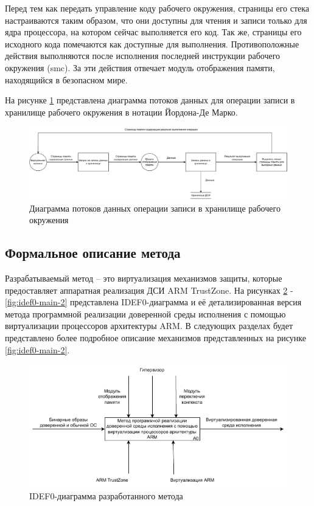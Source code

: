 Перед тем как передать управление коду рабочего окружения, страницы его стека настраиваются таким образом, что они доступны для чтения и записи только для ядра процессора, на котором сейчас выполняется его код. Так же, страницы его исходного кода помечаются как доступные для выполнения. Противоположные действия выполняются после исполнения последней инструкции рабочего окружения (smc). За эти действия отвечает модуль отображения памяти, находящийся в безопасном мире.

На рисунке \ref{fig:ciee} представлена диаграмма потоков данных для операции записи в хранилище рабочего окружения в нотации Йордона-Де Марко.

\begin{figure}[h]
	\centering
	\includegraphics[width=\textwidth]{img/dfd-ciee.pdf}
	\caption{Диаграмма потоков данных операции записи в хранилище рабочего окружения}
	\label{fig:ciee}
\end{figure}

\subsection{Формальное описание метода}

Разрабатываемый метод -- это виртуализация механизмов защиты, которые предоставляет аппаратная реализация ДСИ ARM TrustZone. На рисунках \ref{fig:idef0-main-1} - \ref{fig:idef0-main-2} представлена IDEF0-диаграмма и её детализированная версия метода программной реализации доверенной среды исполнения с помощью виртуализации процессоров архитектуры ARM. В следующих разделах будет представлено более подробное описание механизмов представленных на рисунке \ref{fig:idef0-main-2}.

\begin{figure}[h]
	\centering
	\includegraphics[width=\textwidth]{img/main-idef0-1.pdf}
	\caption{IDEF0-диаграмма разработанного метода}
	\label{fig:idef0-main-1}
\end{figure}


